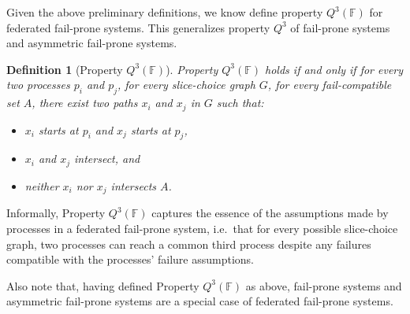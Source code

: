 \documentclass[11pt]{article}
\newtheorem{definition}{Definition}
\begin{document}
Given the above preliminary definitions, we know define property $Q^3(\mathbb{F})$ for federated fail-prone systems. This generalizes property $Q^3$ of fail-prone systems and asymmetric fail-prone systems.

\begin{definition}[Property $Q^3(\mathbb{F})$]
  Property $Q^3(\mathbb{F})$ holds if and only if for every two processes $p_i$ and $p_j$, for every slice-choice graph $G$, for every fail-compatible set $A$, there exist two paths $x_i$ and $x_j$ in $G$ such that:
  \begin{itemize}
    \item $x_i$ starts at $p_i$ and $x_j$ starts at $p_j$,
    \item $x_i$ and $x_j$ intersect, and
    \item neither $x_i$ nor $x_j$ intersects $A$.
  \end{itemize}
\end{definition}

Informally, Property $Q^3(\mathbb{F})$ captures the essence of the assumptions made by processes in a federated fail-prone system, i.e.\ that for every possible slice-choice graph, two processes can reach a common third process despite any failures compatible with the processes' failure assumptions.

Also note that, having defined Property $Q^3(\mathbb{F})$ as above, fail-prone systems and asymmetric fail-prone systems are a special case of federated fail-prone systems.
\end{document}
